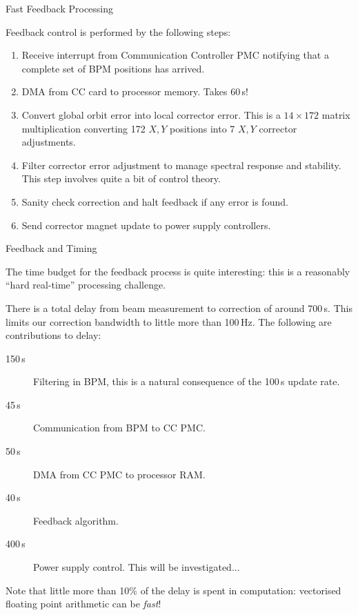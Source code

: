 \documentclass{beamer}
\begin{document}
%
\begin{frame}{Fast Feedback Processing}

Feedback control is performed by the following steps:

\begin{enumerate}
\item Receive interrupt from Communication Controller PMC notifying that a
complete set of BPM positions has arrived.
\item DMA from CC card to processor memory.  Takes 60\,\textmu s!
\item Convert global orbit error into local corrector error.  This is a $14
\times 172$ matrix multiplication converting 172 $X,Y$ positions into 7 $X,Y$
corrector adjustments.
\item Filter corrector error adjustment to manage spectral response and
stability.  This step involves quite a bit of control theory.
\item Sanity check correction and halt feedback if any error is found.
\item Send corrector magnet update to power supply controllers.
\end{enumerate}

\end{frame}


%
\begin{frame}{Feedback and Timing}

The time budget for the feedback process is quite interesting: this is a
reasonably ``hard real-time'' processing challenge.

\medskip

There is a total delay from beam measurement to correction of around
700\,\textmu s.  This limits our correction bandwidth to little more than
100\,Hz.  The following are contributions to delay:

\begin{description}
\item[150\,\textmu s] Filtering in BPM, this is a natural consequence of the
100\,\textmu s update rate.
\item[45\,\textmu s] Communication from BPM to CC PMC.
\item[50\,\textmu s] DMA from CC PMC to processor RAM.
\item[40\,\textmu s] Feedback algorithm.
\item[400\,\textmu s] Power supply control.  This will be investigated...
\end{description}

\medskip

Note that little more than 10\% of the delay is spent in computation: vectorised
floating point arithmetic can be \emph{fast}!

\end{frame}
\end{document}
